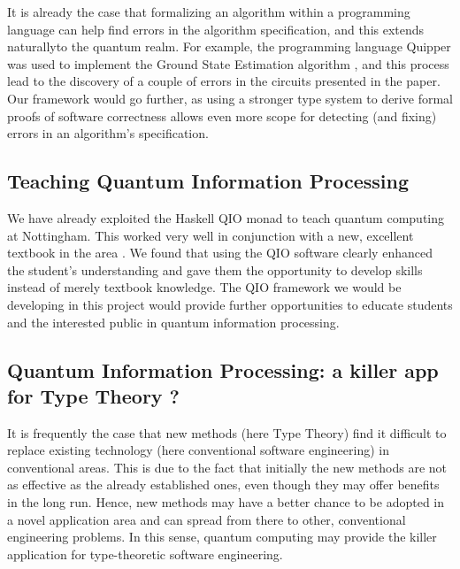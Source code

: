 \documentclass[a4paper]{article}
\begin{document}
It is already the case that formalizing an algorithm within a
programming language can help find errors in the algorithm
specification, and this extends  naturallyto the quantum realm. For
example, the programming language Quipper was used to implement the
Ground State Estimation algorithm \cite{GSE}, and this process lead to
the discovery of a couple of errors in the circuits presented in the
paper. Our framework would go further, as using a stronger type
system to derive formal proofs of software correctness allows even
more scope for detecting (and fixing) errors in an algorithm's
specification.

\subsection*{Teaching Quantum Information Processing}
\label{sec:teaching-qip}

We have already exploited the Haskell QIO monad to teach quantum
computing at Nottingham. This worked very well in conjunction with a
new, excellent textbook in the area \cite{Mermin}. We found that using
the QIO software clearly enhanced the student's understanding and gave
them the opportunity to develop skills instead of merely textbook
knowledge. The QIO framework we would be developing in
this project would provide further opportunities to educate students
and the interested public in quantum information processing. 

\subsection*{Quantum Information Processing: a killer app for Type Theory ?}
\label{sec:qip-killer-app}

It is frequently the case that new methods (here Type Theory) find it
difficult to replace existing technology (here conventional software
engineering) in conventional areas. This is due to the fact that
initially the new methods are not as effective as the already
established ones, even though they may offer benefits in the long
run. Hence, new methods may have a better chance to be adopted in a
novel application area and can spread from there to other, conventional
engineering problems. In this sense, quantum computing may provide the
killer application for type-theoretic software engineering.


 
\end{document}
